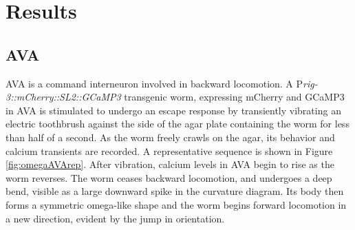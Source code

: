 \section{Results}
\subsection{AVA}
AVA is a command interneuron involved in backward locomotion.  A P\textit{rig-3::mCherry::SL2::GCaMP3} transgenic worm, expressing mCherry and GCaMP3 in AVA is stimulated to undergo an escape response by transiently vibrating an electric toothbrush against the side of the agar plate containing the worm for less than half of a second.  As the worm freely crawls on the agar, its behavior and calcium transients are recorded. A representative sequence is shown in Figure \ref{fig:omegaAVArep}.  After vibration, calcium levels in AVA begin to rise as the worm reverses. The worm ceases backward locomotion, and undergoes a deep bend, visible as a large downward spike in the curvature diagram. Its body then forms a symmetric omega-like shape and the worm begins forward locomotion in a new direction, evident by the jump in  orientation. 


